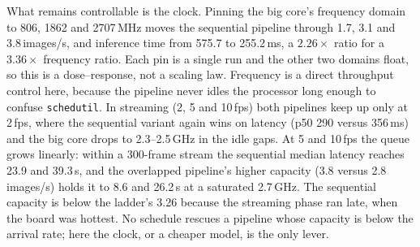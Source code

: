 What remains controllable is the clock. Pinning the big core's
frequency domain to 806, 1862 and 2707\,MHz moves the sequential
pipeline through 1.7, 3.1 and 3.8\,images/s, and inference time from
575.7 to 255.2\,ms, a $2.26\times$ ratio for a $3.36\times$ frequency
ratio. Each pin is a single run and the other two domains float, so
this is a dose--response, not a scaling law. Frequency is a direct
throughput control here, because the pipeline never idles the
processor long enough to confuse \texttt{schedutil}. In streaming (2,
5 and 10\,fps) both pipelines keep up only at 2\,fps, where the
sequential variant again wins on latency (p50 290 versus 356\,ms) and
the big core drops to 2.3--2.5\,GHz in the idle gaps. At 5 and
10\,fps the queue grows linearly: within a 300-frame stream the
sequential median latency reaches 23.9 and 39.3\,s, and the
overlapped pipeline's higher capacity (3.8 versus 2.8\,images/s) holds
it to 8.6 and 26.2\,s at a saturated 2.7\,GHz. The sequential capacity
is below the ladder's 3.26 because the streaming phase ran late, when
the board was hottest. No schedule rescues a pipeline whose capacity
is below the arrival rate; here the clock, or a cheaper model, is the
only lever.

